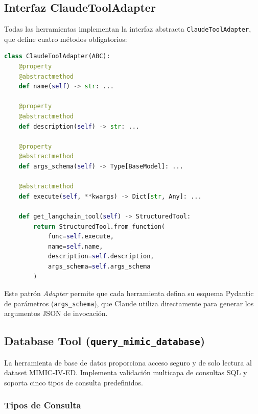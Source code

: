 \subsection{Interfaz ClaudeToolAdapter}

Todas las herramientas implementan la interfaz abstracta \texttt{ClaudeToolAdapter}, que define cuatro métodos obligatorios:

\begin{lstlisting}[language=Python, basicstyle=\tiny\ttfamily, backgroundcolor=\color{codebg}]
class ClaudeToolAdapter(ABC):
    @property
    @abstractmethod
    def name(self) -> str: ...
    
    @property
    @abstractmethod
    def description(self) -> str: ...
    
    @property
    @abstractmethod
    def args_schema(self) -> Type[BaseModel]: ...
    
    @abstractmethod
    def execute(self, **kwargs) -> Dict[str, Any]: ...
    
    def get_langchain_tool(self) -> StructuredTool:
        return StructuredTool.from_function(
            func=self.execute,
            name=self.name,
            description=self.description,
            args_schema=self.args_schema
        )
\end{lstlisting}

Este patrón \textit{Adapter} permite que cada herramienta defina su esquema Pydantic de parámetros (\texttt{args\_schema}), que Claude utiliza directamente para generar los argumentos \ac{JSON} de invocación.

\subsection{Database Tool (\texttt{query\_mimic\_database})}
\label{sec:appendix_dbtool}

La herramienta de base de datos proporciona acceso seguro y de solo lectura al dataset \acs{MIMIC}-IV-\acs{ED}. Implementa validación multicapa de consultas \ac{SQL} y soporta cinco tipos de consulta predefinidos.

\subsubsection{Tipos de Consulta}

